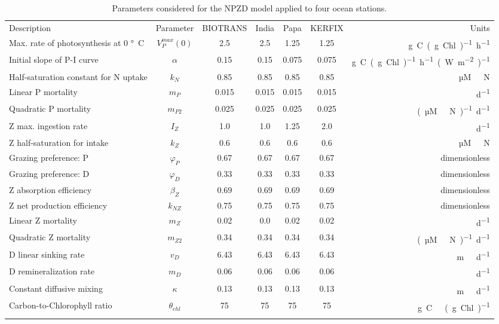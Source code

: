\documentclass[gmd, manuscript]{copernicus}
\begin{document}
%
\begin{table}[t]
\caption{Parameters considered for the NPZD model applied to four ocean stations.}
\begin{tabular}{l c c c c c r}
\tophline
Description & Parameter & BIOTRANS & India & Papa & KERFIX & Units \\
\middlehline

Max. rate of photosynthesis at 0 \unit{\degree C} & $V_P^{max}(0)$ & 2.5 & 2.5 & 1.25 & 1.25 & \unit{g C (g Chl)^{-1} h^{-1}}\\
Initial slope of P-I curve & $\alpha$ & 0.15 & 0.15 & 0.075 & 0.075 & \unit{g C (g Chl)^{-1} h^{-1} (W m^{-2})^{-1}}\\
Half-saturation constant for N uptake & $k_N$ & 0.85  & 0.85  & 0.85  & 0.85 & \unit{µM \ N} \\
Linear P mortality & $m_P$ & 0.015 & 0.015 & 0.015 & 0.015  & \unit{d^{−1}} \\
Quadratic P mortality & $m_{P2}$ & 0.025 & 0.025 & 0.025 & 0.025 & \unit{(µM \ N)^{-1} d^{−1}} \\
Z max. ingestion rate & $I_Z$ & 1.0 & 1.0 & 1.25 & 2.0 & \unit{d^{−1}} \\
Z half-saturation for intake & $k_Z$ & 0.6 & 0.6 & 0.6 & 0.6 & \unit{µM \ N} \\
Grazing preference: P & $\varphi_P$ & 0.67 & 0.67 & 0.67 & 0.67 & dimensionless\\
Grazing preference: D & $\varphi_D$ & 0.33 & 0.33 & 0.33 & 0.33 & dimensionless\\
Z absorption efficiency & $\beta_Z$ & 0.69 & 0.69 & 0.69 & 0.69 & dimensionless\\
Z net production efficiency & $k_{NZ}$ & 0.75 & 0.75 & 0.75 &  0.75 & dimensionless\\
Linear Z mortality & $m_Z$ & 0.02 & 0.0 & 0.02 & 0.02 & \unit{d^{−1}} \\
Quadratic Z mortality & $m_{Z2}$ & 0.34 & 0.34 & 0.34 & 0.34 & \unit{(µM \ N)^{-1} d^{−1}}  \\
D linear sinking rate & $v_D$ & 6.43 & 6.43 & 6.43 & 6.43 & \unit{m \ d^{−1}}\\
D remineralization rate & $m_D$ & 0.06 & 0.06 & 0.06 & 0.06 & \unit{d^{−1}} \\
Constant diffusive mixing & $\kappa$ & 0.13 & 0.13 & 0.13 & 0.13 & \unit{m \ d^{−1}}\\
Carbon-to-Chlorophyll ratio & $\theta_{chl}$ &  75 & 75 & 75 & 75 & \unit{g C \ (g Chl)^{−1}} \\

\bottomhline
\end{tabular}
\label{Table:EMPOWERparams}
\end{table}
%
\end{document}
